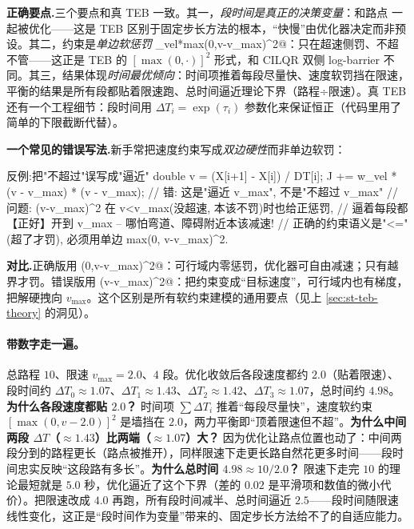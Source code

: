\noindent\textbf{正确要点.}\;三个要点和真 TEB 一致。其一，\emph{段时间是真正的决策变量}：\verb@dT@ 和路点 \verb@x@ 一起被优化——这是 TEB 区别于固定步长方法的根本，“快慢”由优化器决定而非预设。其二，约束是\emph{单边软惩罚} \verb@w_vel*max(0,v-v_max)^2@：只在超速侧罚、不超不管——这正是 TEB 的 $[\max(0,\cdot)]^2$ 形式，和 CILQR 双侧 log-barrier 不同。其三，结果体现\emph{时间最优倾向}：时间项推着每段尽量快、速度软罚挡在限速，平衡的结果是所有段都贴着限速跑、总时间逼近理论下界（路程÷限速）。真 TEB 还有一个工程细节：段时间用 $\Delta T_i=\exp(\tau_i)$ 参数化来保证恒正（代码里用了简单的下限截断代替）。

\noindent{}\textbf{一个常见的错误写法.}\;新手常把速度约束写成\emph{双边硬性}而非单边软罚：

\begin{codebox}[C++]{反例:把"不超过"误写成"逼近"}
double v = (X[i+1] - X[i]) / DT[i];
J += w_vel * (v - v_max) * (v - v_max);   // 错: 这是"逼近 v_max", 不是"不超过 v_max"
// 问题: (v-v_max)^2 在 v<v_max(没超速, 本该不罚)时也给正惩罚,
//       逼着每段都【正好】开到 v_max -- 哪怕弯道、障碍附近本该减速!
//       正确的约束语义是"<="(超了才罚), 必须用单边 max(0, v-v_max)^2.
\end{codebox}

\noindent\textbf{对比.}\;正确版用 \verb@max(0,v-v_max)^2@：可行域内零惩罚，优化器可自由减速；只有越界才罚。错误版用 \verb@(v-v_max)^2@：把约束变成“目标速度”，可行域内也有梯度，把解硬拽向 $v_{\max}$。这个区别是所有软约束建模的通用要点（见上 \cref{sec:st-teb-theory} 的洞见）。

\paragraph{带数字走一遍。}
总路程 $10$、限速 $v_{\max}=2.0$、$4$ 段。优化收敛后各段速度都约 $2.0$（贴着限速）、段时间约 $\Delta T_0\approx1.07$、$\Delta T_1\approx1.43$、$\Delta T_2\approx1.42$、$\Delta T_3\approx1.07$，总时间约 $4.98$。\textbf{为什么各段速度都贴 $2.0$？} 时间项 $\sum\Delta T_i$ 推着“每段尽量快”，速度软约束 $[\max(0,v-2.0)]^2$ 是墙挡在 $2.0$，两力平衡即“顶着限速但不超”。\textbf{为什么中间两段 $\Delta T$（$\approx1.43$）比两端（$\approx1.07$）大？} 因为优化让路点位置也动了：中间两段分到的路程更长（路点被推开），同样限速下走更长路自然花更多时间——段时间忠实反映“这段路有多长”。\textbf{为什么总时间 $4.98\approx 10/2.0$？} 限速下走完 $10$ 的理论最短就是 $5.0$ 秒，优化逼近了这个下界（差的 $0.02$ 是平滑项和数值的微小代价）。把限速改成 $4.0$ 再跑，所有段时间减半、总时间逼近 $2.5$——段时间随限速线性变化，这正是“段时间作为变量”带来的、固定步长方法给不了的自适应能力。

